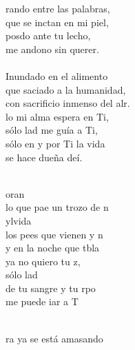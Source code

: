 \documentclass[12pt]{article}
\begin{document}
 
    \sffamily

    \portada[titulo=Cantoral, subtitulo=Grupo San Francisco]
    \newpage
    \tableofcontents
    \newpage


    \begin{multicols*}{2}
    
\begin{cancion}%
	rando entre las palabras,\\
	que se inctan en mi piel,\\
	posdo ante tu lecho,\\
	me andono sin querer.\\
	\jump\\
Inundado en el alimento\\
	que saciado a la humanidad,\\
	con sacrificio inmenso del alr.\\
	lo mi alma espera en Ti,  \\
	sólo lad me guía a Ti, \\
	sólo en y por Ti la vida \\
	se hace dueña deí. \\\jump\\
	\begin{chorus}%
	oran \\
	lo que pae un trozo de n\\
	ylvida \\
	los pees que vienen y n \\
	y en la noche que tbla \\
	ya no quiero tu z, \\
	sólo lad \\
	de tu sangre y tu rpo  \\
	me puede iar a T\\
	\end{chorus}%
	\jump\\
	ra ya se está amasando \\

\end{cancion}
\end{multicols*}
\end{document}

